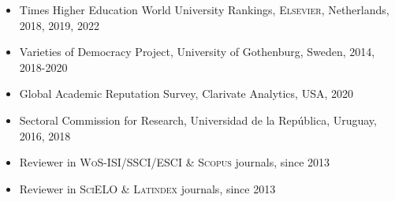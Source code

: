 





\begin{publications}

\begin{itemize}
\item{\small Times Higher Education World University Rankings, {\scshape Elsevier}, 
Netherlands, 2018, 2019, 2022}
\item{\small Varieties of Democracy Project, University of Gothenburg, Sweden, 2014, 2018-2020}
\item{\small Global Academic Reputation Survey, Clarivate Analytics, USA, 2020}
\item{\small Sectoral Commission for Research, Universidad de la Rep\'ublica, Uruguay, 2016, 2018}
\item{\small Reviewer in {\scshape WoS-ISI/SSCI/ESCI} \& {\scshape Scopus} journals, since 2013}
\item{\small Reviewer in {\scshape SciELO} \& {\scshape Latindex} journals, since 2013}
\end{itemize}

\vspace{1mm}
\end{publications}
